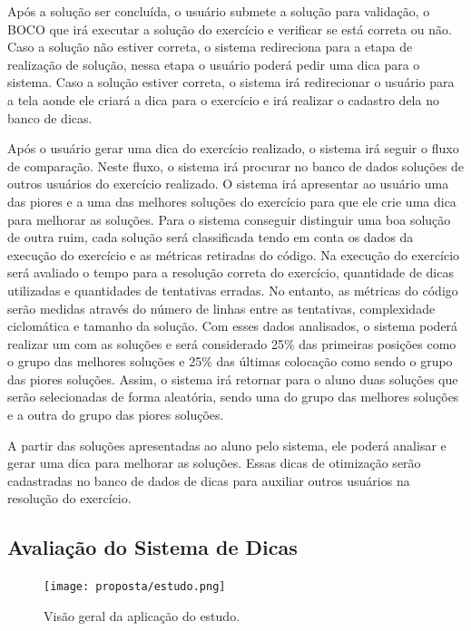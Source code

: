 Após a solução ser concluída, o usuário submete a solução para validação, o BOCO que irá executar a solução do exercício e verificar se está correta ou não. Caso a solução não estiver correta, o sistema redireciona para a etapa de realização de solução, nessa etapa o usuário poderá pedir uma dica para o sistema. Caso a solução estiver correta, o sistema irá redirecionar o usuário para a tela aonde ele criará a dica para o exercício e irá realizar o cadastro dela no banco de dicas.

Após o usuário gerar uma dica do exercício realizado, o sistema irá seguir o fluxo de comparação. Neste fluxo, o sistema irá procurar no banco de dados soluções de outros usuários do exercício realizado. O sistema irá apresentar ao usuário uma das piores e a uma das melhores soluções do exercício para que ele crie uma dica para melhorar as soluções. Para o sistema conseguir distinguir uma boa solução de outra ruim, cada solução será classificada tendo em conta os dados da execução do exercício e as métricas retiradas do código. Na execução do exercício será avaliado o tempo para a resolução correta do exercício, quantidade de dicas utilizadas e quantidades de tentativas erradas. No entanto, as métricas do código serão medidas através do número de linhas entre as tentativas, complexidade ciclomática e tamanho da solução. Com esses dados analisados, o sistema poderá realizar um  com as soluções e será considerado 25\% das primeiras posições como o grupo das melhores soluções e 25\% das últimas colocação como sendo o grupo das piores soluções. Assim, o sistema irá retornar para o aluno duas soluções que serão selecionadas de forma aleatória, sendo uma do grupo das melhores soluções e a outra do grupo das piores soluções.

A partir das soluções apresentadas ao aluno pelo sistema, ele poderá analisar e gerar uma dica para melhorar as soluções. Essas dicas de otimização serão cadastradas no banco de dados de dicas para auxiliar outros usuários na resolução do exercício.

\subsection{Avaliação do Sistema de Dicas}

\begin{figure}[]
	\centering
	\captionsetup{justification=centering}
	\texttt{[image: proposta/estudo.png]}
	\caption{Visão geral da aplicação do estudo.}
	\label{figura:estudo}
\end{figure}


